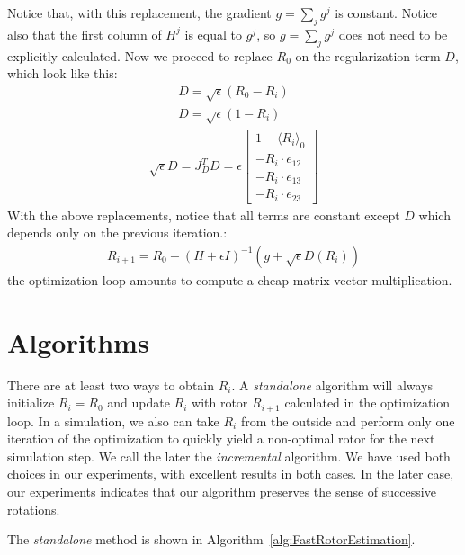 \documentclass{birkjour}
\numberwithin{equation}{section}
\begin{document}
Notice that, with this replacement, the gradient $g = \sum_j{g^j}$ is constant. Notice also that the first column of $H^j$ is equal to $g^j$, 
so $g = \sum_j{g^j}$ does not need to be explicitly calculated. 
Now we proceed to replace $R_0$ on the regularization term $D$, which look like this:
\begin{eqnarray*}
D = \sqrt{\epsilon} (R_0 - R_i)\\
D = \sqrt{\epsilon} (1 - R_i)
\end{eqnarray*}
\begin{eqnarray*}
\sqrt{\epsilon} D = J_D^T D = \epsilon 
\left[\begin{array}{c} 1-\langle R_i \rangle_0 \\ -R_i \cdot e_{12} \\ -R_i \cdot e_{13} \\ -R_i \cdot e_{23}\end{array}\right]
\end{eqnarray*}
With the above replacements, notice that all terms are constant except $D$ which depends only on the previous iteration.:
\begin{eqnarray*}
R_{i+1} = R_0 - (H + \epsilon I)^{-1} (g + \sqrt{\epsilon} D(R_i))
\end{eqnarray*}
the optimization loop amounts to compute a cheap matrix-vector multiplication.

\section{Algorithms}

There are at least two ways to obtain $R_i$. A \emph{standalone} algorithm will always initialize $R_i = R_0$ and update $R_i$ with rotor $R_{i+1}$ calculated in the optimization loop. In a simulation, we also can take $R_i$ from the outside and perform only one iteration of the optimization to quickly yield a non-optimal rotor for the next simulation step. We call the later the \emph{incremental} algorithm. We have used both choices in our experiments, with excellent results in both cases. In the later case, our experiments indicates that our algorithm preserves the sense of successive rotations.

The \emph{standalone} method is shown in Algorithm~\ref{alg:FastRotorEstimation}. 
\end{document}
